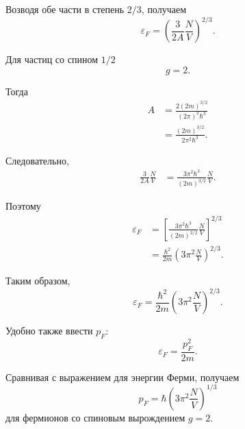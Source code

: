 \documentclass[../final.tex]{subfiles}
\begin{document}
Возводя обе части в степень $2/3$, получаем
%
\[
    \boxed{
        \varepsilon_F
        =
        \left(
            \frac{3}{2A}
            \frac{N}{V}
        \right)^{2/3}
    }.
\]

Для частиц со спином $1/2$
%
\begin{equation*}
    g
    =
    2.
\end{equation*}

Тогда
%
\begin{align*}
    A
    &=
    \frac{
        2(2m)^{3/2}
    }{
        (2\pi)^2\hbar^3
    }
    \\[4pt]
    &=
    \frac{
        (2m)^{3/2}
    }{
        2\pi^2\hbar^3
    }.
\end{align*}

Следовательно,
%
\begin{align*}
    \frac{3}{2A}
    \frac{N}{V}
    &=
    \frac{
        3\pi^2\hbar^3
    }{
        (2m)^{3/2}
    }
    \frac{N}{V}.
\end{align*}

Поэтому
%
\begin{align*}
    \varepsilon_F
    &=
    \left[
        \frac{
            3\pi^2\hbar^3
        }{
            (2m)^{3/2}
        }
        \frac{N}{V}
    \right]^{2/3}
    \\[6pt]
    &=
    \frac{\hbar^2}{2m}
    \left(
        3\pi^2
        \frac{N}{V}
    \right)^{2/3}.
\end{align*}

Таким образом,
%
\[
    \boxed{
        \varepsilon_F
        =
        \frac{\hbar^2}{2m}
        \left(
            3\pi^2
            \frac{N}{V}
        \right)^{2/3}
    }.
\]

Удобно также ввести  $p_F$:
%
\begin{equation*}
    \varepsilon_F
    =
    \frac{p_F^2}{2m}.
\end{equation*}

Сравнивая с выражением для энергии Ферми, получаем
%
\[
    \boxed{
        p_F
        =
        \hbar
        \left(
            3\pi^2
            \frac{N}{V}
        \right)^{1/3}
    }
\]
%
для фермионов со спиновым вырождением $g=2$.
\end{document}
